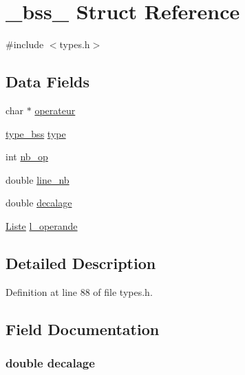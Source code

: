 \hypertarget{struct__bss__}{\section{\-\_\-bss\-\_\- Struct Reference}
\label{struct__bss__}
}


{\ttfamily \#include $<$types.\-h$>$}

\subsection*{Data Fields}
\begin{DoxyCompactItemize}
\item 
char $\ast$ \hyperlink{struct__bss___adc2a267b945f31e8e0dad4b528128cab}{operateur}
\item 
\hyperlink{types_8h_acb96c22a8f4234d82582857a216d04fc}{type\-\_\-bss} \hyperlink{struct__bss___aad08bab2b3236673ec49e299ca32a07e}{type}
\item 
int \hyperlink{struct__bss___a88a29c0db6a919d126d1c94d573dd711}{nb\-\_\-op}
\item 
double \hyperlink{struct__bss___a808a37180ef5a21555b2f0f68cf73cb6}{line\-\_\-nb}
\item 
double \hyperlink{struct__bss___aac945295366b3dadfd1ec0da01eb6cb8}{decalage}
\item 
\hyperlink{liste_8h_a5268448ae2a031c105e053d5ea682580}{Liste} \hyperlink{struct__bss___acdac487d99d10dba873a0f07707b220f}{l\-\_\-operande}
\end{DoxyCompactItemize}


\subsection{Detailed Description}


Definition at line 88 of file types.\-h.



\subsection{Field Documentation}
\hypertarget{struct__bss___aac945295366b3dadfd1ec0da01eb6cb8}{
\subsubsection[{decalage}]{\setlength{\rightskip}{0pt plus 5cm}double decalage}}\label{struct__bss___aac945295366b3dadfd1ec0da01eb6cb8}


